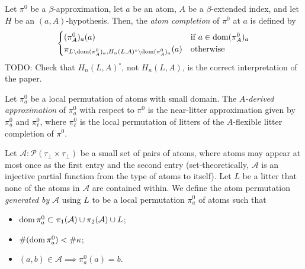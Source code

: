 \documentclass{article}
\begin{document}
\begin{definition}
    Let \( \pi^0 \) be a \( \beta \)-approximation, let \( a \) be an atom, \( A \) be a \( \beta \)-extended index, and let \( H \) be an \( (a, A) \)-hypothesis.
    Then, the \emph{atom completion} of \( \pi^0 \) at \( a \) is defined by
    \[ \begin{cases}
        (\pi^0_A)_a(a) & \text{if } a \in \operatorname{dom} (\pi^0_A)_a \\
        \pi_{L \setminus \operatorname{dom} (\pi^0_A)_a, H_n(L, A)^\circ \setminus \operatorname{dom} (\pi^0_A)_a}(a) & \text{otherwise}
    \end{cases} \]
    TODO: Check that \( H_n(L, A)^\circ \), not \( H_n(L, A) \), is the correct interpretation of the paper.
\end{definition}
\begin{definition}
    Let \( \pi^0_a \) be a local permutation of atoms with small domain.
    The \emph{\( A \)-derived approximation} of \( \pi^0_a \) with respect to \( \pi^0 \) is the near-litter approximation given by \( \pi^0_a \) and \( \pi^0_\ell \), where \( \pi^0_\ell \) is the local permutation of litters of the \( A \)-flexible litter completion of \( \pi^0 \).
\end{definition}
\begin{definition}
    Let \( \mathcal A \colon \mathcal P (\tau_\bot \times \tau_\bot) \) be a small set of pairs of atoms, where atoms may appear at most once as the first entry and the second entry (set-theoretically, \( \mathcal A \) is an injective partial function from the type of atoms to itself).
    Let \( L \) be a litter that none of the atoms in \( \mathcal A \) are contained within.
    We define the atom permutation \emph{generated by} \( \mathcal A \) using \( L \) to be a local permutation \( \pi^0_a \) of atoms such that
    \begin{itemize}
        \item \( \operatorname{dom} \pi^0_a \subset \pi_1(\mathcal A) \cup \pi_2(\mathcal A) \cup L \);
        \item \( \#(\operatorname{dom} \pi^0_a) < \#\kappa \);
        \item \( (a, b) \in \mathcal A \implies \pi^0_a(a) = b \).
    \end{itemize}
\end{definition}
\end{document}
